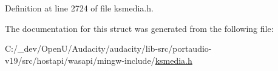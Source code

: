 Definition at line 2724 of file ksmedia.\+h.



The documentation for this struct was generated from the following file\+:\begin{DoxyCompactItemize}
\item 
C\+:/\+\_\+dev/\+Open\+U/\+Audacity/audacity/lib-\/src/portaudio-\/v19/src/hostapi/wasapi/mingw-\/include/\hyperlink{ksmedia_8h}{ksmedia.\+h}\end{DoxyCompactItemize}
